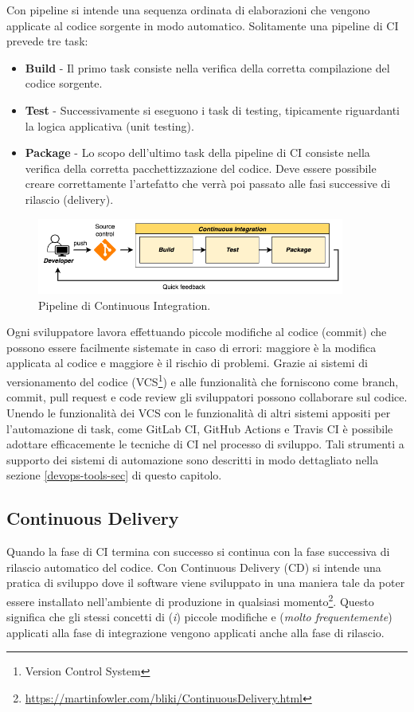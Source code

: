 Con pipeline si intende una sequenza ordinata di elaborazioni che vengono applicate al codice sorgente in modo automatico. Solitamente una pipeline di CI prevede tre task:

\begin{itemize}
    \item \textbf{Build} - Il primo task consiste nella verifica della corretta compilazione del codice sorgente.
    \item \textbf{Test} - Successivamente si eseguono i task di testing, tipicamente riguardanti la logica applicativa (unit testing).
    \item \textbf{Package} - Lo scopo dell'ultimo task della pipeline di CI consiste nella verifica della corretta pacchettizzazione del codice. Deve essere possibile creare correttamente l'artefatto che verrà poi passato alle fasi successive di rilascio (delivery).
\end{itemize}

\begin{figure}[H]
    \centering
    \includegraphics[width=0.9\textwidth]{img/ci-pipeline.png}
    \caption{Pipeline di Continuous Integration.}
    \label{ci-pipeline}
\end{figure}

Ogni sviluppatore lavora effettuando piccole modifiche al codice (commit) che possono essere facilmente sistemate in caso di errori: maggiore è la modifica applicata al codice e maggiore è il rischio di problemi. Grazie ai sistemi di versionamento del codice (VCS\footnote{Version Control System}) e alle funzionalità che forniscono come branch, commit, pull request e code review gli sviluppatori possono collaborare sul codice. Unendo le funzionalità dei VCS con le funzionalità di altri sistemi appositi per l'automazione di task, come GitLab CI, GitHub Actions e Travis CI è possibile adottare efficacemente le tecniche di CI nel processo di sviluppo. Tali strumenti a supporto dei sistemi di automazione sono descritti in modo dettagliato nella sezione \ref{devops-tools-sec} di questo capitolo.

\subsection{Continuous Delivery}
\label{cd-sec}
Quando la fase di CI termina con successo si continua con la fase successiva di rilascio automatico del codice. Con Continuous Delivery (CD) si intende una pratica di sviluppo dove il software viene sviluppato in una maniera tale da poter essere installato nell'ambiente di produzione in qualsiasi momento\footnote{\href{https://martinfowler.com/bliki/ContinuousDelivery.html}{https://martinfowler.com/bliki/ContinuousDelivery.html}}. Questo significa che gli stessi concetti di (\textit{i}) piccole modifiche e (\textit{molto frequentemente}) applicati alla fase di integrazione vengono applicati anche alla fase di rilascio.

